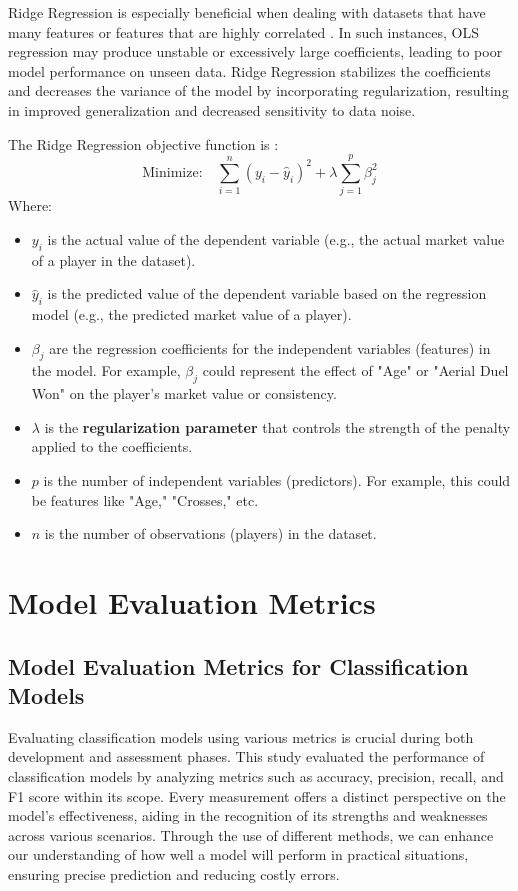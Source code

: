 \documentclass[12pt, a4paper,oneside]{book}
\numberwithin{equation}{section}
\begin{document}
Ridge Regression is especially beneficial when dealing with datasets that have many features or features that are highly correlated \cite{hoerl1970}. In such instances, OLS regression may produce unstable or excessively large coefficients, leading to poor model performance on unseen data. Ridge Regression stabilizes the coefficients and decreases the variance of the model by incorporating regularization, resulting in improved generalization and decreased sensitivity to data noise.

The Ridge Regression objective function is \cite{friedman2010}:
\[\text{Minimize:} \quad \sum_{i=1}^{n} (y_i - \hat{y}_i)^2 + \lambda \sum_{j=1}^{p} \beta_j^2\]
Where:
\begin{itemize}
    \item \( y_i \) is the actual value of the dependent variable (e.g., the actual market value of a player in the dataset).
    \item \( \hat{y}_i \) is the predicted value of the dependent variable based on the regression model (e.g., the predicted market value of a player).
    \item \( \beta_j \) are the regression coefficients for the independent variables (features) in the model. For example, \( \beta_j \) could represent the effect of "Age" or "Aerial Duel Won" on the player's market value or consistency.
    \item \( \lambda \) is the \textbf{regularization parameter} that controls the strength of the penalty applied to the coefficients.
    \item \( p \) is the number of independent variables (predictors). For example, this could be features like "Age," "Crosses," etc.
    \item \( n \) is the number of observations (players) in the dataset.
\end{itemize}

\section{Model Evaluation Metrics}\label{sec:3.3}

\subsection{Model Evaluation Metrics for Classification Models}\label{sec:3.3.1}

Evaluating classification models using various metrics is crucial during both development and assessment phases. This study evaluated the performance of classification models by analyzing metrics such as accuracy, precision, recall, and F1 score within its scope. Every measurement offers a distinct perspective on the model's effectiveness, aiding in the recognition of its strengths and weaknesses across various scenarios. Through the use of different methods, we can enhance our understanding of how well a model will perform in practical situations, ensuring precise prediction and reducing costly errors.
\end{document}
